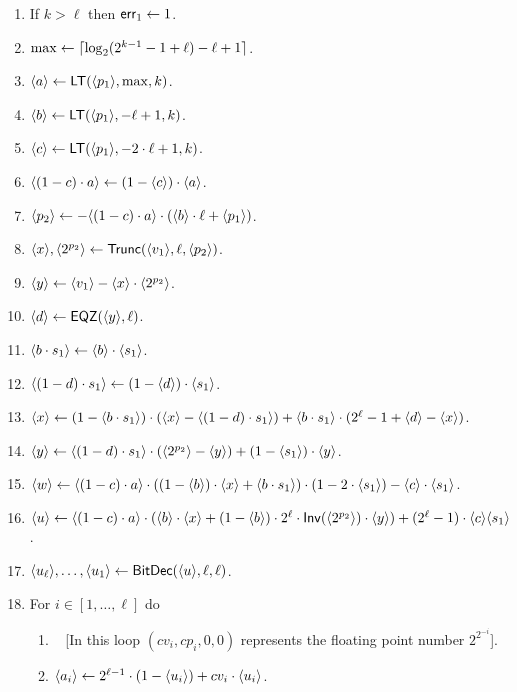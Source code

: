 \begin{enumerate}
\item If $k>\ell$ then $\mathsf{err}_1 \leftarrow 1$.
\item $\max \leftarrow {\lceil \log_2(2^{k-1}-1+\ell)-\ell+1 \rceil}$.
\item $\langle a \rangle \leftarrow \mathsf{LT}(\langle p_1 \rangle,\max,k)$.
\item $\langle b \rangle \leftarrow \mathsf{LT}(\langle p_1 \rangle,-\ell+1,k)$.
\item $\langle c \rangle \leftarrow \mathsf{LT}(\langle p_1 \rangle,-2 \cdot \ell+1,k)$.
\item $\langle (1-c) \cdot a \rangle \leftarrow (1-\langle c \rangle) \cdot \langle a \rangle$.
\item $\langle p_2 \rangle \leftarrow -\langle (1-c) \cdot a \rangle \cdot (\langle b \rangle \cdot \ell +\langle p_1 \rangle)$.
\item $\langle x \rangle,\langle 2^{p_2} \rangle \leftarrow \mathsf{Trunc}(\langle v_1 \rangle,\ell,\langle p_2 \rangle)$.
\item $\langle y \rangle \leftarrow \langle v_1 \rangle-\langle x \rangle \cdot \langle 2^{p_2} \rangle$.
\item $\langle d \rangle \leftarrow \mathsf{EQZ}(\langle y \rangle,\ell)$.
\item $\langle b \cdot s_1 \rangle \leftarrow \langle b \rangle \cdot \langle s_1 \rangle$.
\item $\langle (1-d) \cdot s_1 \rangle \leftarrow (1-\langle d \rangle) \cdot \langle s_1 \rangle$.
\item $\langle x \rangle \leftarrow (1-\langle b \cdot s_1 \rangle)
	                 \cdot (\langle x \rangle-\langle (1-d)\cdot s_1 \rangle)
		+\langle b \cdot s_1 \rangle \cdot(2^\ell-1+\langle d \rangle-\langle x \rangle)$.
\item $\langle y \rangle \leftarrow \langle (1-d) \cdot s_1 \rangle \cdot (\langle 2^{p_2} \rangle-\langle y \rangle)
			+ (1-\langle s_1 \rangle)\cdot \langle y \rangle$.
\item $\langle w \rangle \leftarrow \langle (1-c) \cdot a \rangle \cdot
			((1-\langle b \rangle) \cdot\langle x \rangle+\langle b \cdot s_1 \rangle)
			\cdot (1-2\cdot \langle s_1 \rangle)-\langle c \rangle \cdot \langle s_1 \rangle$.
\item $\langle u \rangle \leftarrow \langle (1-c) \cdot a \rangle
			\cdot (\langle b \rangle \cdot \langle x \rangle
			+(1-\langle b \rangle) \cdot 2^\ell \cdot \mathsf{Inv}(\langle 2^{p_2} \rangle)
							\cdot \langle y \rangle)
			+(2^\ell-1)\cdot \langle c \rangle \langle s_1 \rangle$.
\item $\langle u_\ell \rangle,\ldots,\langle u_1 \rangle \leftarrow \mathsf{BitDec}(\langle u \rangle,\ell,\ell)$.
\item For $i \in [1,\ldots,\ell]$ do
\begin{enumerate}
  \item~ [In this loop $(cv_i,cp_i,0,0)$ represents the floating point number $2^{2^{-i}}$].
  \item $\langle a_i \rangle \leftarrow 2^{\ell-1} \cdot (1-\langle u_i \rangle)+cv_i \cdot \langle u_i \rangle$.

\end{enumerate}
\end{enumerate}
